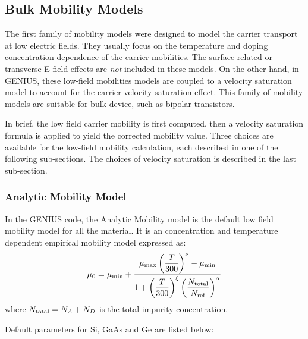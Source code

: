 \documentclass[oneside,12pt]{cgd_book}
\begin{document}
\subsection{Bulk Mobility Models}
The first family of mobility models were designed to model the carrier transport at low electric fields.
        They usually focus on the temperature and doping concentration dependence of the carrier mobilities. The
        surface-related or transverse E-field effects are {\em not}
included in these models. On the
        other hand, in GENIUS, these low-field mobilities models are coupled to a velocity saturation model to account
        for the carrier velocity saturation effect. This family of mobility models are suitable for bulk device, such as
        bipolar transistors.
\par
In brief, the low field carrier mobility is first computed, then a velocity saturation formula is applied
        to yield the corrected mobility value. Three choices are available for the low-field mobility calculation, each
        described in one of the following sub-sections. The choices of velocity saturation is described in the last
        sub-section.
\par
\subsubsection[sec:Equation:Mobility:Bulk:Analytic]{Analytic Mobility Model}
\label{mobility+Analytic model}In the GENIUS code, the Analytic Mobility model
\cite{Selberherr1984P} is the
          default low field mobility model for all the material. It is an concentration and temperature dependent
          empirical mobility model expressed as:
\begin{equation}
\mu_{0}=\mu_{\rm min}+\dfrac{\mu_{\rm max}\left(\dfrac{T}{300}\right)^\nu-\mu_{\rm
            min}}{1+\left(\dfrac{T}{300}\right)^\xi \left(\dfrac{N_{\rm total}}{N_{\rm ref}}\right)^\alpha}
\end{equation}
where $N_{\rm total}=N_A+N_D$ is the total impurity concentration.
\par
Default parameters for Si, GaAs and Ge are listed below:
\end{document}
